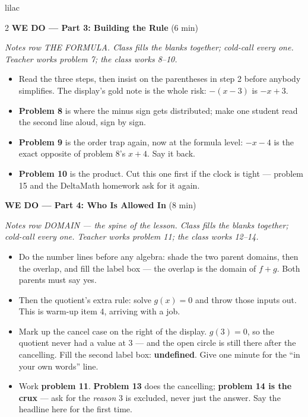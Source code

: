 \documentclass[10pt]{article}
\begin{document}
\begin{skillbox}{lilac}
\begin{multicols}{2}
\textbf{WE DO --- Part 3: Building the Rule} (6 min)

\textit{Notes row THE FORMULA. Class fills the blanks together; cold-call every
one. Teacher works problem 7; the class works 8--10.}
\begin{itemize}
  \item Read the three steps, then insist on the parentheses in step 2 before
        anybody simplifies. The display's gold note is the whole risk:
        $-(x-3)$ is $-x + 3$.
  \item \textbf{Problem 8} is where the minus sign gets distributed; make one
        student read the second line aloud, sign by sign.
  \item \textbf{Problem 9} is the order trap again, now at the formula level:
        $-x - 4$ is the exact opposite of problem 8's $x + 4$. Say it back.
  \item \textbf{Problem 10} is the product. Cut this one first if the clock is
        tight --- problem 15 and the DeltaMath homework ask for it again.
\end{itemize}

\textbf{WE DO --- Part 4: Who Is Allowed In} (8 min)

\textit{Notes row DOMAIN --- the spine of the lesson. Class fills the blanks
together; cold-call every one. Teacher works problem 11; the class works
12--14.}
\begin{itemize}
  \item Do the number lines before any algebra: shade the two parent domains,
        then the overlap, and fill the label box --- the overlap is the domain of
        \textbf{$f+g$}. Both parents must say yes.
  \item Then the quotient's extra rule: solve $g(x) = 0$ and throw those inputs
        out. This is warm-up item 4, arriving with a job.
  \item Mark up the cancel case on the right of the display. $g(3) = 0$, so the
        quotient never had a value at 3 --- and the open circle is still there
        after the cancelling. Fill the second label box: \textbf{undefined}. Give
        one minute for the ``in your own words'' line.
  \item Work \textbf{problem 11}. \textbf{Problem 13} does the cancelling;
        \textbf{problem 14 is the crux} --- ask for the \textit{reason} 3 is
        excluded, never just the answer. Say the headline here for the first
        time.
\end{itemize}


\end{multicols}
\end{skillbox}
\end{document}
